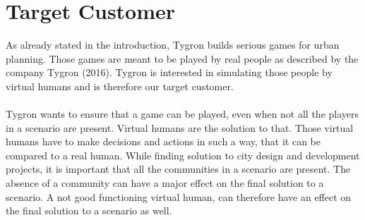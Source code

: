 \section{Target Customer}
As already stated in the introduction, Tygron builds serious games for urban planning. Those games are meant to be played by real people as described by the company Tygron (2016). Tygron is interested in simulating those people by virtual humans and is therefore our target customer.\\
\\
Tygron wants to ensure that a game can be played, even when not all the players in a scenario are present. Virtual humans are the solution to that. Those virtual humans have to make decisions and actions in such a way, that it can be compared to a real human. While finding solution to city design and development projects, it is important that all the communities in a scenario are present. The absence of a community can have a major effect on the final solution to a scenario. A not good functioning virtual human, can therefore have an effect on the final solution to a scenario as well. 